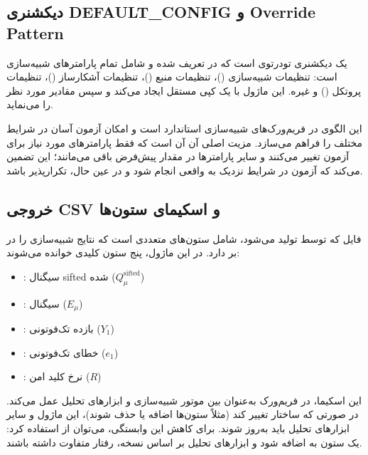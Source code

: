 \subsection{دیکشنری DEFAULT\_CONFIG و Override Pattern}

 یک دیکشنری تودرتوی است که در  تعریف شده و شامل تمام پارامترهای شبیه‌سازی است: تنظیمات شبیه‌سازی ()، تنظیمات منبع ()، تنظیمات آشکارساز ()، تنظیمات پروتکل () و غیره. این ماژول با  یک کپی مستقل ایجاد می‌کند و سپس مقادیر مورد نظر را  می‌نماید.

این الگوی  در فریم‌ورک‌های شبیه‌سازی استاندارد است و امکان آزمون آسان در شرایط مختلف را فراهم می‌سازد. مزیت اصلی آن آن است که فقط پارامترهای مورد نیاز برای آزمون تغییر می‌کنند و سایر پارامترها در مقدار پیش‌فرض باقی می‌مانند؛ این تضمین می‌کند که آزمون در شرایط نزدیک به واقعی انجام شود و در عین حال، تکرارپذیر باشد.

\subsection{خروجی CSV و اسکیمای ستون‌ها}

فایل  که توسط  تولید می‌شود، شامل ستون‌های متعددی است که نتایج شبیه‌سازی را در بر دارد. در این ماژول، پنج ستون کلیدی خوانده می‌شوند:

\begin{itemize}
	\item {}:  سیگنال sifted شده ($Q_\mu^{\text{sifted}}$)
	\item {}:  سیگنال ($E_\mu$)
	\item {}: بازده تک‌فوتونی ($Y_1$)
	\item {}: خطای تک‌فوتونی ($e_1$)
	\item {}: نرخ کلید امن ($R$)
\end{itemize}

این اسکیما، در فریم‌ورک به‌عنوان  بین موتور شبیه‌سازی و ابزارهای تحلیل عمل می‌کند. در صورتی که ساختار  تغییر کند (مثلاً ستون‌ها اضافه یا حذف شوند)، این ماژول و سایر ابزارهای تحلیل باید به‌روز شوند. برای کاهش این وابستگی، می‌توان از  استفاده کرد: یک ستون  به  اضافه شود و ابزارهای تحلیل بر اساس نسخه، رفتار متفاوت داشته باشند.

